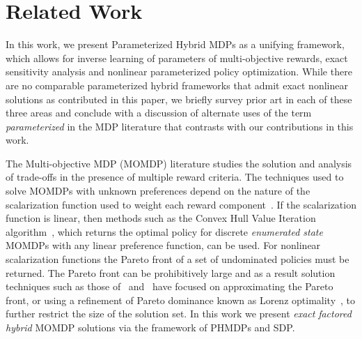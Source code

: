 \section{Related Work}
\label{sec:background}


In this work, we present Parameterized Hybrid MDPs as a unifying framework, which allows for inverse learning of parameters of multi-objective rewards, exact sensitivity analysis and nonlinear parameterized policy optimization. While there are no comparable parameterized hybrid frameworks that admit exact nonlinear solutions as contributed in this paper, we briefly survey prior art in each of these three areas and conclude with a discussion of alternate uses of the term \emph{parameterized} in the MDP literature that contrasts with our contributions in this work.

The Multi-objective MDP (MOMDP) literature studies the solution and analysis of trade-offs in the presence of multiple reward criteria. The techniques used to solve MOMDPs with unknown preferences depend on the nature of the scalarization function used to weight each reward component~\parencite{Roijers_JAIR_2013}. If the scalarization function is linear, then methods such as the Convex Hull Value Iteration algorithm~\parencite{Barrett_ICML_2008}, which returns the optimal policy for discrete \emph{enumerated state} MOMDPs with any linear preference function, can be used. For nonlinear scalarization functions the Pareto front of a set of undominated policies must be returned. The Pareto front can be prohibitively large and as a result solution techniques such as those of~\parencite{Chatterjee_STACS_2006} and~\parencite{Pirotta_AAAI_2015} have focused on approximating the Pareto front, or using a refinement of Pareto dominance known as Lorenz optimality~\parencite{Perny_AAAI_2013}, to further restrict the size of the solution set.  %
In this work we present \textit{exact} \emph{factored hybrid} MOMDP solutions via the framework of PHMDPs and SDP.

